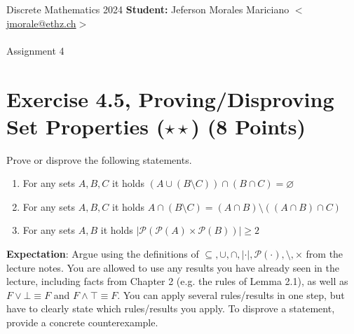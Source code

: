\documentclass[unicode,11pt,a4paper,oneside,numbers=endperiod,openany]{scrartcl}
\begin{document}
\setassignment
{}

\serieheader
{Discrete Mathematics}
{2024}
{%
\textbf{Student:} Jeferson Morales Mariciano 
\href{mailto:jmorale@ethz.ch}{\(<\)jmorale@ethz.ch\(>\)} \\\\}
{\vspace{-1cm}}%
{Assignment 4}{}

\section*{Exercise 4.5, Proving/Disproving Set Properties (\(\star\star\)) \hfill (8 Points)}

Prove or disprove the following statements.

\begin{enumerate}[label=\textbf{\alph*)}]
    \item For any sets \( A, B, C \) it holds
        \( 
            \left( 
                A \cup 
                \left( B \setminus C \right)
            \right) 
            \cap
            \left( B \cap C \right) 
            = \varnothing 
        \)
    \item For any sets \( A, B, C \) it holds
        \( 
            A \cap \left( B \setminus C \right)
            =
            \left( A \cap B \right) 
            \setminus 
            \left( 
                \left( A \cap B \right)
                \cap C 
            \right)
        \)
    \item For any sets \( A, B \) it holds
        \(
            |
            \mathcal{P}\left(
                    \mathcal{P}\left( A \right)
                    \times
                    \mathcal{P}\left( B \right)
                \right)
            |
            \geq 2
        \)
\end{enumerate}

\noindent \textbf{Expectation}: 
Argue using the definitions of 
\( \subseteq, \cup, \cap, |\cdot|,\mathcal{P}(\cdot), \setminus, \times \)
from the lecture notes.
You are allowed to use any results you have already seen in the lecture, 
including facts from Chapter 2 (e.g. the rules of Lemma 2.1), 
as well as \( F \lor \bot \equiv F \) and \( F \land \top \equiv F\). 
You can apply several rules/results in one step, 
but have to clearly state which rules/results you apply. 
To disprove a statement, provide a concrete counterexample.
\\
\end{document}
